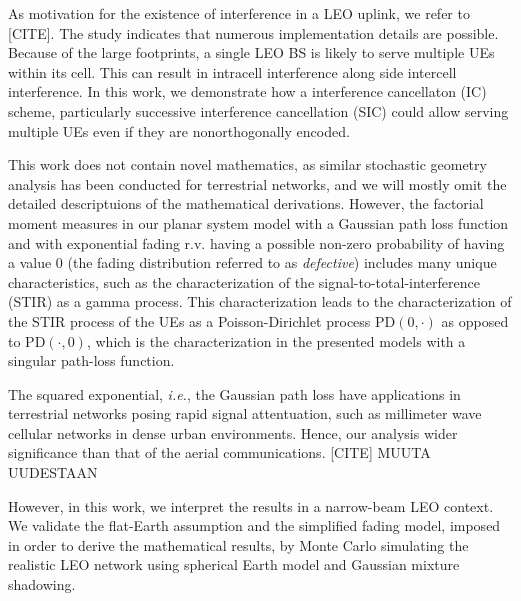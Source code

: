 \documentclass[lettersize,journal]{IEEEtran}
\begin{document}
As motivation for the existence of interference in a LEO uplink, we refer to [CITE]. The study indicates that numerous implementation details are possible. Because of the large footprints, a single LEO BS is likely to serve multiple UEs within its cell. This can result in intracell interference along side intercell interference. In this work, we demonstrate how a interference cancellaton (IC) scheme, particularly successive interference cancellation (SIC) could allow serving multiple UEs even if they are nonorthogonally encoded.

This work does not contain novel mathematics, as similar stochastic geometry analysis has been conducted for terrestrial networks, and we will mostly omit the detailed descriptuions of the mathematical derivations. However, the factorial moment measures in our planar system model with a Gaussian path loss function and with exponential fading r.v. having a possible non-zero probability of having a value $0$ (the fading distribution referred to as \textit{defective}) includes many unique characteristics, such as the characterization of the signal-to-total-interference (STIR) as a gamma process. This characterization leads to the characterization of the STIR process of the UEs as a Poisson-Dirichlet process $\text{PD}(0,\cdot)$ as opposed to $\text{PD}(\cdot,0)$, which is the characterization in the presented models with a singular path-loss function.

The squared exponential, \textit{i.e.}, the Gaussian path loss have applications in terrestrial networks posing rapid signal attentuation, such as millimeter wave cellular networks in dense urban environments. Hence, our analysis wider significance than that of the aerial communications. [CITE] MUUTA UUDESTAAN

 However, in this work, we interpret the results in a narrow-beam LEO context. We validate the flat-Earth assumption and the simplified fading model, imposed in order to derive the mathematical results, by Monte Carlo simulating the realistic LEO network using spherical Earth model and Gaussian mixture shadowing.
\end{document}
